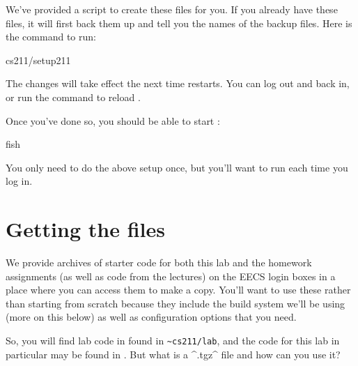 \documentclass{tufte-handout}
\begin{document}
We’ve provided a script to create these files for you. If you already
have these files, it will first back them up and tell you the names of
the backup files. Here is the command to run:

\begin{CmdLine*}
  \C \plaintilde cs211/setup211\\
\end{CmdLine*}


\noindent The changes will take effect the next time 
restarts. You can log out and back in, or run the command  to reload .

Once you’ve done so, you should be able to start :

\begin{CmdLine*}
  \C fish \\
\end{CmdLine*}

You only need to do the above setup once, but you’ll
want to run  each time you log in.


\section{Getting the files}

We provide archives of starter code for both this lab and the homework
assignments (as well as code from the lectures) on the EECS login boxes
in a place where you can access them to make a copy. You'll want to use
these rather than starting from scratch because they include the build
system we’ll be using (more on this below) as well as configuration
options that you need.

So, you will find lab code in found in \verb^~cs211/lab^,%
 and the code for this lab in
particular may be found in \texttt{\ThisLabTgz}. But what is a ^.tgz^
file and how can you use it?
\end{document}
